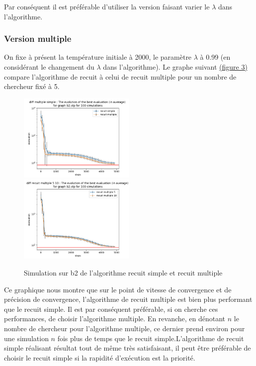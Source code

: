 \documentclass[11pt,french]{report}
\begin{document}
        Par conséquent il est préférable d'utiliser la version faisant varier le $\lambda$ dans l'algorithme.

        \subsubsection{Version multiple}
        On fixe à présent la température initiale à 2000, le paramètre $\lambda$ à 0.99 (en considérant le changement du $\lambda$ dans l'algorithme).
        Le graphe suivant \hyperref[Figure3]{(figure 3)} compare l'algorithme de recuit à celui de recuit multiple pour un nombre de chercheur fixé à 5.
        \begin{figure}
          \includegraphics[width=0.5\textwidth]{best_b2_evaluation_diff multiple simple.png}
          \includegraphics[width=0.5\textwidth]{best_b2_evaluation_diff recuit multiple 5 10.png}
          \caption{Simulation sur b2 de l'algorithme recuit simple et recuit multiple}
          \label{Figure3}
        \end{figure}

        Ce graphique nous montre que sur le point de vitesse de convergence et de précision de convergence, l'algorithme de recuit multiple est bien plus performant que le recuit simple. Il est par conséquent préférable, si on cherche ces performances, de choisir l'algorithme multiple. En revanche, en dénotant $n$ le nombre de chercheur pour l'algorithme multiple, ce dernier prend environ pour une simulation $n$ fois plus de temps que le recuit simple.L'algorithme de recuit simple réalisant résultat tout de même très satisfaisant, il peut être préférable de choisir le recuit simple si la rapidité d'exécution est la priorité.
\end{document}
